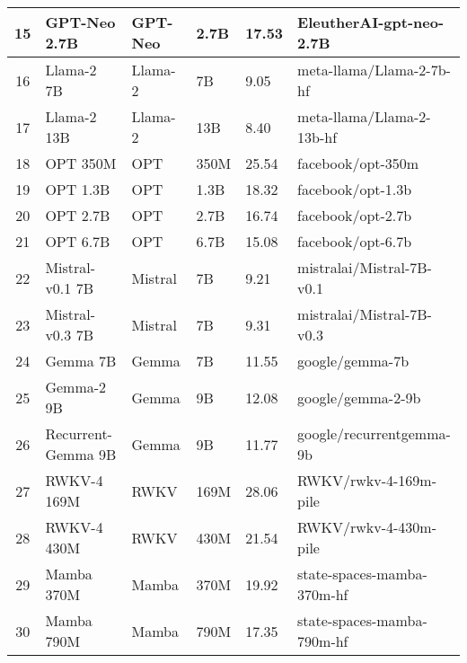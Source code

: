 \begin{table}[ht!]
\begin{tabular}{|c|l|l|l|l|l|}
15 & GPT-Neo 2.7B                & GPT-Neo              & 2.7B                & 17.53        & EleutherAI-gpt-neo-2.7B   \\ \hline
16 & Llama-2 7B                  & Llama-2              & 7B                  & 9.05         & meta-llama/Llama-2-7b-hf  \\ \hline
17 & Llama-2 13B                 & Llama-2              & 13B                 & 8.40         & meta-llama/Llama-2-13b-hf \\ \hline
18 & OPT 350M                    & OPT                  & 350M                & 25.54        & facebook/opt-350m         \\ \hline
19 & OPT 1.3B                    & OPT                  & 1.3B                & 18.32        & facebook/opt-1.3b         \\ \hline
20 & OPT 2.7B                    & OPT                  & 2.7B                & 16.74        & facebook/opt-2.7b         \\ \hline
21 & OPT 6.7B                    & OPT                  & 6.7B                & 15.08        & facebook/opt-6.7b         \\ \hline
22 & Mistral-v0.1 7B             & Mistral              & 7B                  & 9.21         & mistralai/Mistral-7B-v0.1 \\ \hline
23 & Mistral-v0.3 7B             & Mistral              & 7B                  & 9.31         & mistralai/Mistral-7B-v0.3 \\ \hline
24 & Gemma 7B                    & Gemma                & 7B                  & 11.55        & google/gemma-7b          \\ \hline
25 & Gemma-2 9B                  & Gemma                & 9B                  & 12.08        & google/gemma-2-9b        \\ \hline
26 & Recurrent-Gemma 9B          & Gemma                & 9B                  & 11.77        & google/recurrentgemma-9b  \\ \hline
27 & RWKV-4 169M                 & RWKV                 & 169M                & 28.06        & RWKV/rwkv-4-169m-pile     \\ \hline
28 & RWKV-4 430M                 & RWKV                 & 430M                & 21.54        & RWKV/rwkv-4-430m-pile     \\ \hline
29 & Mamba 370M                  & Mamba                & 370M                & 19.92        & state-spaces-mamba-370m-hf \\ \hline
30 & Mamba 790M                  & Mamba                & 790M                & 17.35        & state-spaces-mamba-790m-hf \\ \hline

\end{tabular}
\end{table}
